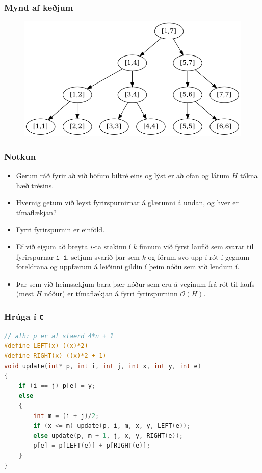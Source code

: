 \documentclass{beamer}
\begin{document}
\begin{frame}
\frametitle{Mynd af keðjum}
	\begin{figure}
		\includegraphics[scale=0.3]{mynd3.png}
	\end{figure}
\end{frame}

\begin{frame}
\frametitle{Notkun}
\begin{itemize}
\item<1-> Gerum ráð fyrir að við höfum biltré eins og lýst er að ofan og látum $H$ tákna hæð trésins.
\item<2-> Hvernig getum við leyst fyrirspurnirnar á glærunni á undan, og hver er tímaflækjan?
\item<3-> Fyrri fyrirspurnin er einföld.
\item<4-> Ef við eigum að breyta $i$-ta stakinu í $k$ finnum við fyrst laufið sem svarar til fyrirspurnar \texttt{i i},
	setjum svarið þar sem $k$ og förum svo upp í rót í gegnum foreldrana og uppfærum á leiðinni gildin í þeim nóðu sem við lendum í.
\item<5-> Þar sem við heimsækjum bara þær nóður sem eru á veginum frá rót til laufs (mest $H$ nóður) er tímaflækjan á fyrri fyrirspurninn $\mathcal{O}(H)$.
\end{itemize}
\end{frame}

\begin{frame}[fragile]
	\frametitle{Hrúga í \texttt{C}}
	\tiny
	\begin{lstlisting}[language=C]
// ath: p er af staerd 4*n + 1
#define LEFT(x) ((x)*2)
#define RIGHT(x) ((x)*2 + 1)
void update(int* p, int i, int j, int x, int y, int e)
{
	if (i == j) p[e] = y;
	else
	{
		int m = (i + j)/2;
		if (x <= m) update(p, i, m, x, y, LEFT(e));
		else update(p, m + 1, j, x, y, RIGHT(e));
		p[e] = p[LEFT(e)] + p[RIGHT(e)];
	}
}
\end{lstlisting}
\end{frame}
\end{document}
